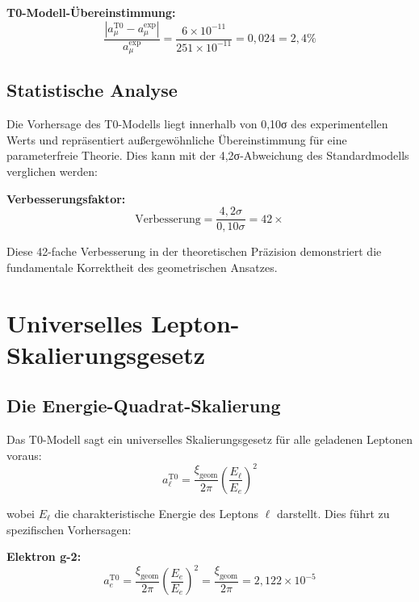 \documentclass[12pt,a4paper]{report}
\newcommand{\xigeom}{\xi_{\text{geom}}}   %
\newcommand{\Ee}{E_e}                     %
\begin{document}
\textbf{T0-Modell-Übereinstimmung:}
\begin{equation}
	\frac{|a_\mu^{\text{T0}} - a_\mu^{\text{exp}}|}{a_\mu^{\text{exp}}} = \frac{6 \times 10^{-11}}{251 \times 10^{-11}} = 0,024 = 2,4\%
	\label{eq:t0_agreement}
\end{equation}

\subsection{Statistische Analyse}
\label{subsec:statistical_analysis}

Die Vorhersage des T0-Modells liegt innerhalb von 0,10σ des experimentellen Werts und repräsentiert außergewöhnliche Übereinstimmung für eine parameterfreie Theorie. Dies kann mit der 4,2σ-Abweichung des Standardmodells verglichen werden:

\textbf{Verbesserungsfaktor:}
\begin{equation}
	\text{Verbesserung} = \frac{4,2\sigma}{0,10\sigma} = 42 \times
	\label{eq:improvement_factor}
\end{equation}

Diese 42-fache Verbesserung in der theoretischen Präzision demonstriert die fundamentale Korrektheit des geometrischen Ansatzes.

\section{Universelles Lepton-Skalierungsgesetz}
\label{sec:universal_scaling}

\subsection{Die Energie-Quadrat-Skalierung}
\label{subsec:energy_squared_scaling}

Das T0-Modell sagt ein universelles Skalierungsgesetz für alle geladenen Leptonen voraus:
\begin{equation}
	a_\ell^{\text{T0}} = \frac{\xigeom}{2\pi} \left(\frac{E_\ell}{\Ee}\right)^2
	\label{eq:universal_scaling}
\end{equation}

wobei $E_\ell$ die charakteristische Energie des Leptons $\ell$ darstellt. Dies führt zu spezifischen Vorhersagen:

\textbf{Elektron g-2:}
\begin{equation}
	a_e^{\text{T0}} = \frac{\xigeom}{2\pi} \left(\frac{\Ee}{\Ee}\right)^2 = \frac{\xigeom}{2\pi} = 2,122 \times 10^{-5}
	\label{eq:electron_g2}
\end{equation}
\end{document}
